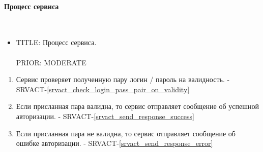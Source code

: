     \paragraph{Процесс сервиса} \mbox{} \\

        \begin{itemize}

             \item {
               TITLE: Процесс сервиса.\\
               \\
               PRIOR: MODERATE\\
             }

             \end{itemize}

        \begin{alg} \label{alg_auth_driver_processing} \mbox{}

             \begin{enumerate}

               \item Сервис проверяет полученную пару логин / пароль на валидность. - SRVACT-\ref{srvact_check_login_pass_pair_on_validity}

               \item Если присланная пара валидна, то сервис отправляет сообщение об успешной авторизации. - SRVACT-\ref{srvact_send_response_success}
              
               \item Если присланная пара не валидна, то сервис отправляет сообщение об ошибке авторизации. - SRVACT-\ref{srvact_send_response_error}

             \end{enumerate}

             \end{alg}

